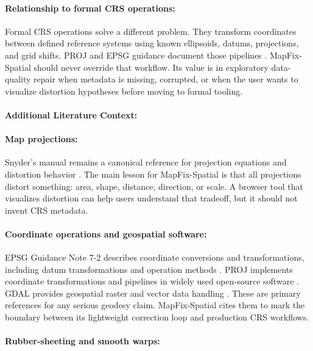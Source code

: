 \documentclass{article}
\begin{document}
\paragraph{Relationship to formal CRS operations:}

Formal CRS operations solve a different problem. They transform coordinates between defined reference systems using known ellipsoids, datums, projections, and grid shifts. PROJ and EPSG guidance document those pipelines \citep{epsg72,proj}. MapFix-Spatial should never override that workflow. Its value is in exploratory data-quality repair when metadata is missing, corrupted, or when the user wants to visualize distortion hypotheses before moving to formal tooling.

\paragraph{Additional Literature Context:}

\paragraph{Map projections:}

Snyder's manual remains a canonical reference for projection equations and distortion behavior \citep{snyder1987map}. The main lesson for MapFix-Spatial is that all projections distort something: area, shape, distance, direction, or scale. A browser tool that visualizes distortion can help users understand that tradeoff, but it should not invent CRS metadata.

\paragraph{Coordinate operations and geospatial software:}

EPSG Guidance Note 7-2 describes coordinate conversions and transformations, including datum transformations and operation methods \citep{epsg72}. PROJ implements coordinate transformations and pipelines in widely used open-source software \citep{proj}. GDAL provides geospatial raster and vector data handling \citep{gdal}. These are primary references for any serious geodesy claim. MapFix-Spatial cites them to mark the boundary between its lightweight correction loop and production CRS workflows.

\paragraph{Rubber-sheeting and smooth warps:}
\end{document}
